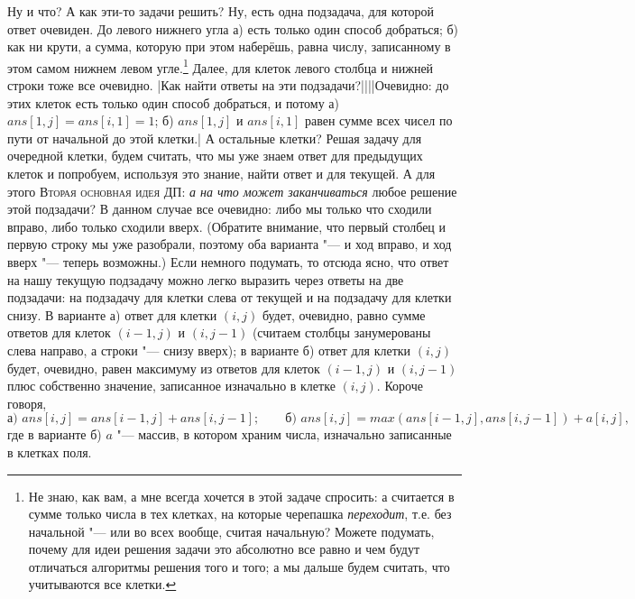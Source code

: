Ну и что? А как эти-то задачи решить? Ну, есть одна подзадача, для которой ответ очевиден. До левого 
нижнего угла а) есть только один способ добраться; б) как ни крути, а сумма, которую при этом 
наберёшь, равна числу, записанному в этом самом нижнем левом угле.\footnote{Не знаю, как вам, а мне 
всегда хочется в этой задаче спросить: а считается в сумме только числа в тех клетках, на которые 
черепашка \textit{переходит}, т.е. без начальной "--- или во всех вообще, считая начальную? Можете 
подумать, почему для идеи решения задачи это абсолютно все равно и чем будут отличаться алгоритмы 
решения того и того; а мы дальше будем считать, что учитываются все клетки.} Далее, для клеток 
левого столбца и нижней строки тоже все очевидно.  
|Как найти ответы на эти подзадачи?||||Очевидно: до этих клеток есть только один способ добраться, и потому а) $ans[1,j]=ans[i,1]=1$; б) $ans[1,j]$ и $ans[i,1]$ равен сумме всех чисел по пути от начальной до этой клетки.|
А остальные клетки? Решая задачу для очередной клетки, будем считать, что мы уже знаем ответ для 
предыдущих клеток и попробуем, используя это знание, найти ответ и для текущей. А для этого 
\textsc{Вторая основная идея ДП:} \textit{а на что может заканчиваться} любое
решение этой подзадачи? В данном случае все очевидно: либо мы только что сходили вправо, либо 
только сходили вверх. (Обратите внимание, что первый столбец и первую строку мы уже разобрали, 
поэтому оба варианта "--- и ход вправо, и ход вверх "--- теперь возможны.) Если немного 
подумать, то отсюда ясно, что ответ на нашу текущую подзадачу можно легко выразить через ответы на 
две подзадачи: на подзадачу для клетки слева от текущей и на подзадачу для клетки снизу. В варианте 
а) ответ для клетки $(i,j)$ будет, очевидно, равно сумме ответов для клеток $(i-1,j)$ и $(i,j-1)$ 
(считаем столбцы занумерованы слева направо, а строки "--- снизу вверх); в варианте б) ответ для 
клетки $(i,j)$ будет, очевидно, равен максимуму из ответов для клеток $(i-1,j)$ и $(i,j-1)$ плюс 
собственно значение, записанное изначально в клетке $(i,j)$. Короче говоря,
$$
\mbox{а) }ans[i,j]=ans[i-1,j]+ans[i,j-1]; 
\qquad\mbox{б) }ans[i,j]=max(ans[i-1,j],ans[i,j-1])+a[i,j],
$$
где в варианте б) $a$ "--- массив, в котором храним числа, изначально записанные в клетках поля.


